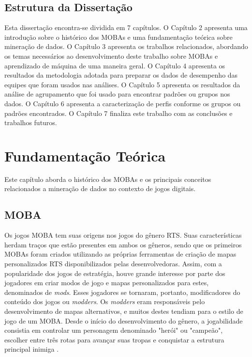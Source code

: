 \section{Estrutura da Dissertação}
Esta dissertação encontra-se dividida em 7 capítulos. O Capítulo 2 apresenta uma introdução sobre o histórico dos MOBAs e uma fundamentação teórica sobre mineração de dados. O Capítulo 3 apresenta os trabalhos relacionados, abordando os temas necessários ao desenvolvimento deste trabalho sobre MOBAs e aprendizado de máquina de uma maneira geral. O Capítulo 4 apresenta os resultados da metodologia adotada para preparar os dados de desempenho das equipes que foram usados nas análises. O Capítulo 5 apresenta os resultados da análise de agrupamento que foi usado para encontrar padrões ou grupos nos dados. O Capítulo 6 apresenta a caracterização de perfis conforme os grupos ou padrões encontrados. O Capítulo 7 finaliza este trabalho com as conclusões e trabalhos futuros.

\chapter{Fundamentação Teórica}

Este capítulo aborda o histórico dos MOBAs e os principais conceitos relacionados a mineração de dados no contexto de jogos digitais.

\section{MOBA}
Os jogos MOBA tem suas origens nos jogos do gênero RTS. Suas características herdam traços que estão presentes em ambos os gêneros, sendo que os primeiros MOBAs foram criados utilizando as próprias ferramentas de criação de mapas personalizados RTS disponibilizados pelas desenvolvedoras. Assim, com a popularidade dos jogos de estratégia, houve grande interesse por parte dos jogadores em criar modos de jogo e mapas personalizados para estes, denominados de \textit{mods}. Esses jogadores se tornaram, portanto, modificadores do conteúdo dos jogos ou \textit{modders}. Os \textit{modders} eram responsáveis pelo desenvolvimento de mapas alternativos, e muitos destes tendiam para o estilo de jogo de um MOBA. Desde o início do desenvolvimento do gênero, a jogabilidade consistia em controlar um personagem denominado "herói" ou "campeão", escolher entre três rotas para avançar suas tropas e conquistar a estrutura principal inimiga \cite{do2016desenvolvimento} \cite{ferrari2013generative} \cite{minotti2014history}.

